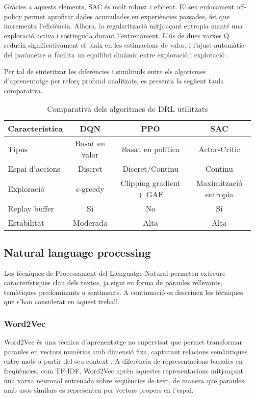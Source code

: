 \documentclass[12pt,a4paper,twoside]{book}
\begin{document}
Gràcies a aquests elements, SAC és molt robust i eficient. El seu enfocament off-policy permet aprofitar dades acumulades en experiències passades, fet que incrementa l'eficiència. Alhora, la regularització mitjançant entropia manté una exploració activa i sostinguda durant l'entrenament. L'ús de dues xarxes Q redueix significativament el biaix en les estimacions de valor, i l'ajust automàtic del paràmetre $\alpha$ facilita un equilibri dinàmic entre exploració i explotació \cite{Haarnoja2018}.

\vspace{2em}

Per tal de sintetitzar les diferències i similituds entre els algorismes d'aprenentatge per reforç profund analitzats, es presenta la següent taula comparativa.
\begin{table}[h]
\centering
\caption{Comparativa dels algoritmes de DRL utilitzats}
\begin{tabular}{lccc}
\hline
\textbf{Característica} & \textbf{DQN} & \textbf{PPO} & \textbf{SAC} \\ \hline
Tipus & Basat en valor & Basat en política & Actor-Crític \\
Espai d'accions & Discret & Discret/Continu & Continu \\
Exploració & $\epsilon$-greedy & Clipping gradient + GAE & Maximització entropia \\
Replay buffer & Sí & No & Sí \\
Estabilitat & Moderada & Alta & Alta \\ \hline
\end{tabular}
\label{tab:comparativa_algoritmes}
\end{table}



\subsection{Natural language processing}

 Les tècniques de Processament del Llenguatge Natural permeten extreure característiques clau dels textos, ja sigui en forma de paraules rellevants, temàtiques predominants o sentiments. A continuació es descriuen les tècniques que s'han considerat en aquest treball.

\subsubsection{Word2Vec}

Word2Vec és una tècnica d'aprenentatge no supervisat que permet transformar paraules en vectors numèrics amb dimensió fixa, capturant relacions semàntiques entre mots a partir del seu context \cite{Mikolov2013}. A diferència de representacions basades en freqüències, com TF-IDF, Word2Vec aprèn aquestes representacions mitjançant una xarxa neuronal entrenada sobre seqüències de text, de manera que paraules amb usos similars es representen per vectors propers en l'espai.
\end{document}
